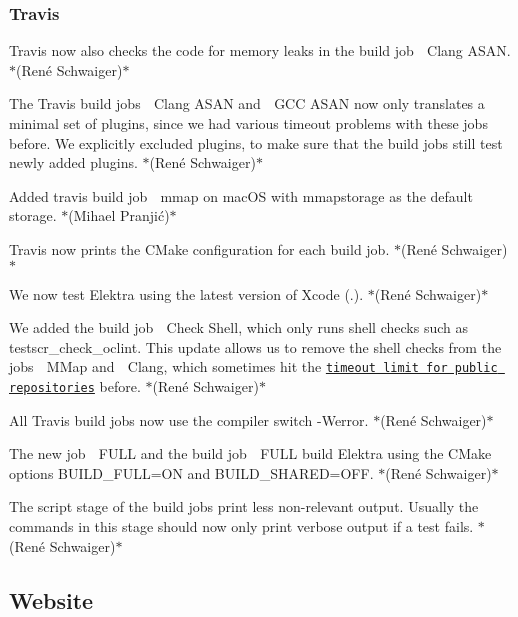 \subsubsection*{Travis}


\begin{DoxyItemize}
\item Travis now also checks the code for memory leaks in the build job {\ttfamily 🍏 Clang A\+S\+AN}. $\ast$(René Schwaiger)$\ast$
\item The Travis build jobs {\ttfamily 🍏 Clang A\+S\+AN} and {\ttfamily 🐧 G\+CC A\+S\+AN} now only translates a minimal set of plugins, since we had various timeout problems with these jobs before. We explicitly excluded plugins, to make sure that the build jobs still test newly added plugins. $\ast$(René Schwaiger)$\ast$
\item Added travis build job {\ttfamily 🍏 mmap} on mac\+OS with {\ttfamily mmapstorage} as the default storage. $\ast$(Mihael Pranjić)$\ast$
\item Travis now prints the C\+Make configuration for each build job. $\ast$(René Schwaiger)$\ast$
\item We now test Elektra using the latest version of Xcode ({.}). $\ast$(René Schwaiger)$\ast$
\item We added the build job {\ttfamily 🍏 Check Shell}, which only runs shell checks such as {\ttfamily testscr\+\_\+check\+\_\+oclint}. This update allows us to remove the shell checks from the jobs {\ttfamily 🍏 M\+Map} and {\ttfamily 🍏 Clang}, which sometimes hit the \href{https://docs.travis-ci.com/user/customizing-the-build#build-timeouts}{\tt timeout limit for public repositories} before. $\ast$(René Schwaiger)$\ast$
\item All Travis build jobs now use the compiler switch {\ttfamily -\/\+Werror}. $\ast$(René Schwaiger)$\ast$
\item The new job {\ttfamily 🍏 F\+U\+LL} and the build job {\ttfamily 🐧 F\+U\+LL} build Elektra using the C\+Make options {\ttfamily B\+U\+I\+L\+D\+\_\+\+F\+U\+LL=ON} and {\ttfamily B\+U\+I\+L\+D\+\_\+\+S\+H\+A\+R\+ED=O\+FF}. $\ast$(René Schwaiger)$\ast$
\item The {\ttfamily script} stage of the build jobs print less non-\/relevant output. Usually the commands in this stage should now only print verbose output if a test fails. $\ast$(René Schwaiger)$\ast$
\end{DoxyItemize}

\subsection*{Website}

